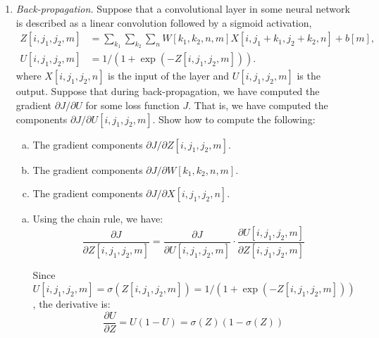 \documentclass[11pt]{article}
\begin{document}
\begin{enumerate}
\begin{solution}
\begin{enumerate}[(a)]
The number of output elements is $46 \times 62 \times 20 = 57,040$.

Total multiplications: $57,040 \times 90 = 5,133,600$.

\item The number of trainable parameters:
\begin{align*}
\text{Parameters in } W &: 3 \times 3 \times 10 \times 20 = 1,800 \\
\text{Parameters in } b &: 20 \\
\text{Total} &: 1,820
\end{align*}
\end{enumerate}
\end{solution}

\item \emph{Back-propagation.}
Suppose that a convolutional layer in some neural network
is described as a linear convolution followed by a sigmoid activation,
\begin{align*}
    Z[i,j_1,j_2,m] &= \sum_{k_1} \sum_{k_2} \sum_n W[k_1,k_2,n,m]X[i,j_1+k_1,j_2+k_2,n] + b[m], \\
    U[i,j_1,j_2,m] &= 1/(1+\exp(-Z[i,j_1,j_2,m])).
\end{align*}
where $X[i,j_1,j_2,n]$ is the input of the layer and $U[i,j_1,j_2,m]$ is the output.
Suppose that during back-propagation, we have computed the gradient $\partial J/\partial U$ for some loss function $J$.
That is, we have computed  the components $\partial J/\partial U[i,j_1,j_2,m]$.
Show how to compute the following:
\begin{enumerate}[(a)]
\item The gradient components $\partial J/\partial Z[i,j_1,j_2,m]$.
\item The gradient components $\partial J/\partial W[k_1,k_2,n,m]$.
\item The gradient components $\partial J/\partial X[i,j_1,j_2,n]$.
\end{enumerate}

\begin{solution}
\begin{enumerate}[(a)]
\item Using the chain rule, we have:
\[
\frac{\partial J}{\partial Z[i,j_1,j_2,m]} = \frac{\partial J}{\partial U[i,j_1,j_2,m]} \cdot \frac{\partial U[i,j_1,j_2,m]}{\partial Z[i,j_1,j_2,m]}
\]

Since $U[i,j_1,j_2,m] = \sigma(Z[i,j_1,j_2,m]) = 1/(1+\exp(-Z[i,j_1,j_2,m]))$, the derivative is:
\[
\frac{\partial U}{\partial Z} = U(1-U) = \sigma(Z)(1-\sigma(Z))
\]


\end{enumerate}
\end{solution}
\end{enumerate}
\end{document}
